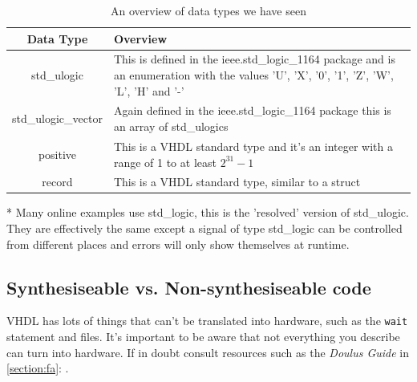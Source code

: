 \documentclass[11pt,a4paper]{article}
\begin{document}
\begin{table}[H]
    \begin{center}
    \begin{threeparttable}
        \begin{tabular}{| c | m{ } |}
            \hline
             Data Type & Overview \\ \hline
             std\_ulogic \tnote{*}& This is defined in the ieee.std\_logic\_1164 package and is an enumeration with the values 'U', 'X', '0', '1', 'Z', 'W', 'L', 'H' and '-' \\ \hline
             std\_ulogic\_vector & Again defined in the ieee.std\_logic\_1164 package this is an array of std\_ulogics \\ \hline
             positive & This is a VHDL standard type and it's an integer with a range of 1 to at least $2^{31} -1$  \\ \hline
             record & This is a VHDL standard type, similar to a struct \\ \hline
        \end{tabular}
        \begin{tablenotes}
        \footnotesize
        \item[*] Many online examples use std\_logic, this is the 'resolved' version of std\_ulogic. They are effectively the same except a signal of type std\_logic can be controlled from different places and errors will only show themselves at runtime.
        \end{tablenotes}
        \end{threeparttable}
        \caption{An overview of data types we have seen}
        \label{table:datatypes}
    \end{center}
\end{table}

\subsection{Synthesiseable vs. Non-synthesiseable code}
VHDL has lots of things that can't be translated into hardware, such as the \texttt{wait} statement and files. It's important to be aware that not everything you describe can turn into hardware. If in doubt consult resources such as the \emph{Doulus Guide} in \cref{section:fa}: .
\end{document}
